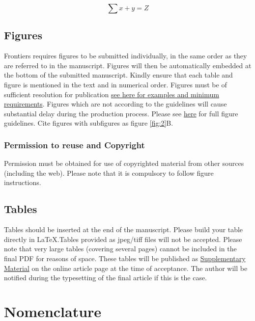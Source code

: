 \documentclass[utf8]{frontiersSCNS} %
\begin{document}
\begin{equation}
\sum x+ y =Z\label{eq:01}
\end{equation}

\subsection{Figures}
Frontiers requires figures to be submitted individually, in the same order as
they are referred to in the manuscript. Figures will then be automatically
embedded at the bottom of the submitted manuscript. Kindly ensure that each
table and figure is mentioned in the text and in numerical order. Figures must
be of sufficient resolution for publication
\href{http://home.frontiersin.org/about/author-guidelines#ResolutionRequirements}{see
here for examples and minimum requirements}. Figures which are not according to
the guidelines will cause substantial delay during the production process.
Please see
\href{http://home.frontiersin.org/about/author-guidelines#GeneralStyleGuidelinesforFigures}{here}
for full figure guidelines. Cite figures with subfigures as figure
\ref{fig:2}B.


\subsubsection{Permission to reuse and Copyright}
Permission must be obtained for use of copyrighted material from other sources
(including the web). Please note that it is compulsory to follow figure
instructions.

\subsection{Tables}
Tables should be inserted at the end of the manuscript. Please build your table
directly in LaTeX.Tables provided as jpeg/tiff files will not be accepted.
Please note that very large tables (covering several pages) cannot be included
in the final PDF for reasons of space. These tables will be published as
\href{http://home.frontiersin.org/about/author-guidelines#SupplementaryMaterial}{Supplementary
Material} on the online article page at the time of acceptance. The author will
be notified during the typesetting of the final article if this is the case.

\section{Nomenclature}
\end{document}
